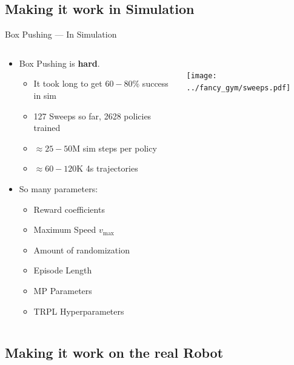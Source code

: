 \documentclass[16:9,en,navbarinfooter]{sdqbeamer}
\begin{document}
\subsection{Making it work in Simulation}
\begin{frame}{Box Pushing --- In Simulation}

	\begin{columns}[t]
		\begin{column}{0.4\textwidth}
			\vspace{1cm}
			\begin{itemize}
				\item Box Pushing is \textbf{hard}.
				      \begin{itemize}
					      \item It took long to get $60-80$\% success in sim
					      \item 127 Sweeps so far, 2628 policies trained
					      \item $\approx 25-50\text{M}$ sim steps per policy
					      \item $\approx 60-120\text{K}$ 4s trajectories
				      \end{itemize}
				\item So many parameters:
				      \begin{itemize}
					      \item Reward coefficients
					      \item Maximum Speed $v_{\max}$
					      \item Amount of randomization
					      \item Episode Length
					      \item MP Parameters
					      \item TRPL Hyperparameters
				      \end{itemize}
			\end{itemize}
		\end{column}
		\begin{column}{0.5\textwidth}
			\vspace{.2cm} \\
			\center
			\texttt{[image: ../fancy\_gym/sweeps.pdf]} \\

		\end{column}
	\end{columns}
\end{frame}

\subsection{Making it work on the real Robot}
\end{document}
